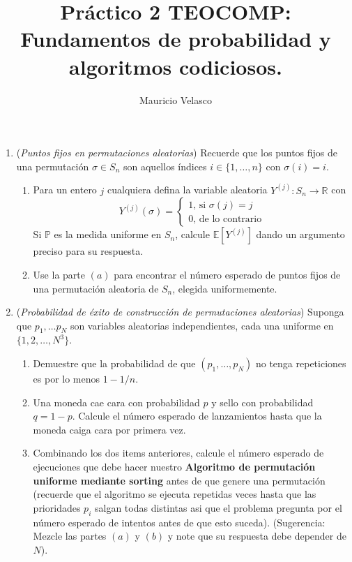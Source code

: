 \documentclass[12pt, a4paper]{article}
\date{}
\newcommand{\RR}{\mathbb{R}}
\newcommand{\EE}{\mathbb{E}}
\begin{document}
\title{Pr\'actico 2 TEOCOMP: Fundamentos de probabilidad y algoritmos codiciosos.}
\author{Mauricio Velasco}
\maketitle{}


\begin{enumerate}
\item ({\it Puntos fijos en permutaciones aleatorias}) Recuerde que los puntos fijos de una permutación $\sigma\in S_n$ son aquellos índices $i\in \{1,\dots, n\}$ con $\sigma(i)=i$.
\begin{enumerate}
\item Para un entero $j$ cualquiera defina la variable aleatoria $Y^{(j)}:S_n\rightarrow \RR$ con 
\[Y^{(j)}(\sigma)=
\begin{cases}
1\text{, si $\sigma(j)=j$}\\
0\text{, de lo contrario}
\end{cases}
\]
Si $\mathbb{P}$ es la medida uniforme en $S_n$, calcule $\EE[Y^{(j)}]$ dando un argumento preciso para su respuesta.
\item Use la parte $(a)$ para encontrar el número esperado de puntos fijos de una permutación aleatoria de $S_n$, elegida uniformemente.
\end{enumerate}


\item ({\it Probabilidad de éxito de construcción de permutaciones aleatorias}) Suponga que $p_1,\dots p_N$ son variables aleatorias independientes, cada una uniforme en $\{1,2,\dots, N^3\}$.
\begin{enumerate}
\item Demuestre que la probabilidad de que $(p_1,\dots,p_N)$ no tenga repeticiones es por lo menos $1-1/n$.
\item Una moneda cae cara con probabilidad $p$ y sello con probabilidad $q=1-p$. Calcule el número esperado de lanzamientos hasta que la moneda caiga cara por primera vez.
\item Combinando los dos items anteriores, calcule el número esperado de ejecuciones que debe hacer nuestro {\bf Algoritmo de permutación uniforme mediante sorting} antes de que genere una permutación (recuerde que el algoritmo se ejecuta repetidas veces hasta que las prioridades $p_i$ salgan todas distintas asi que el problema pregunta por el número esperado de intentos antes de que esto suceda). (Sugerencia: Mezcle las partes $(a)$ y $(b)$ y note que su respuesta debe depender de $N$).
\end{enumerate}


\end{enumerate}
\end{document}
